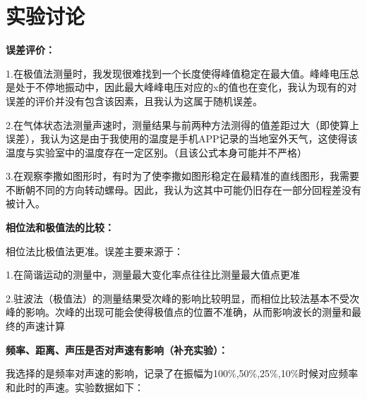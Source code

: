 \documentclass[a4paper, 10pt]{article}
\begin{document}
\section{实验讨论}
\noindent \textbf{误差评价：}

\vspace{10pt}
\noindent 1.在极值法测量时，我发现很难找到一个长度使得峰值稳定在最大值。峰峰电压总是处于不停地振动中，因此最大峰峰电压对应的x的值也在变化，我认为现有的对误差的评价并没有包含该因素，且我认为这属于随机误差。

\vspace{10pt}
\noindent 2.在气体状态法测量声速时，测量结果与前两种方法测得的值差距过大（即使算上误差），我认为这是由于我使用的温度是手机APP记录的当地室外天气，这使得该温度与实验室中的温度存在一定区别。（且该公式本身可能并不严格）

\vspace{10pt}
\noindent 3.在观察李撒如图形时，有时为了使李撒如图形稳定在最精准的直线图形，我需要不断朝不同的方向转动螺母。因此，我认为这其中可能仍旧存在一部分回程差没有被计入。

\vspace{10pt}
\noindent \textbf{相位法和极值法的比较：}
\vspace{10pt}

\noindent 相位法比极值法更准。误差主要来源于：
\vspace{10pt}

\noindent 1.在简谐运动的测量中，测量最大变化率点往往比测量最大值点更准
\vspace{10pt}

\noindent 2.驻波法（极值法）的测量结果受次峰的影响比较明显，而相位比较法基本不受次峰的影响。次峰的出现可能会使得极值点的位置不准确，从而影响波长的测量和最终的声速计算

\noindent \textbf{频率、距离、声压是否对声速有影响（补充实验）：}

\vspace{10pt}
\noindent 我选择的是频率对声速的影响，记录了在振幅为100\%,50\%,25\%,10\%时候对应频率和此时的声速。实验数据如下：
\end{document}
